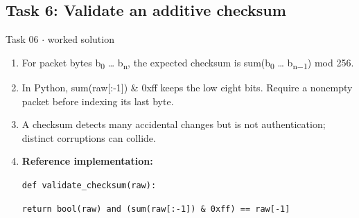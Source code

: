 \documentclass[11pt]{article}
\begin{document}
\begin{keepsection}\subsection{Task 6: Validate an additive checksum}

\begin{workedbox}{Task 06 \ensuremath{\cdot} worked solution}
\begin{enumerate}
\item For packet bytes b\textsubscript{0} … b\textsubscript{n}, the expected checksum is sum(b\textsubscript{0} … b\textsubscript{n\ensuremath{-}1}) mod 256.
\item In Python, sum(raw[:-1]) \& 0xff keeps the low eight bits. Require a nonempty packet before indexing its last byte.
\item A checksum detects many accidental changes but is not authentication; distinct corruptions can collide.
\item {}
\textbf{Reference implementation:}
\begin{tcolorbox}[colback=Paperblue,colframe=Paperblue,boxrule=0pt,arc=0pt,left=7pt,right=7pt,top=5pt,bottom=5pt]\small\sloppy
\noindent\hspace*{0em}\texttt{def validate\_checksum(raw):}\par
\noindent\hspace*{1em}\texttt{return bool(raw) and (sum(raw[:-1]) \& 0xff) == raw[-1]}\par
\end{tcolorbox}
\end{enumerate}
\end{workedbox}

\end{keepsection}
\end{document}
